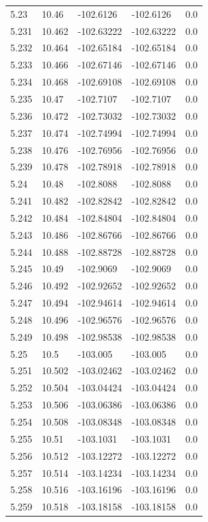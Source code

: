 \begin{tabular}{lllll}
5.23 & 10.46 & -102.6126 & -102.6126 & 0.0 \\
5.231 & 10.462 & -102.63222 & -102.63222 & 0.0 \\
5.232 & 10.464 & -102.65184 & -102.65184 & 0.0 \\
5.233 & 10.466 & -102.67146 & -102.67146 & 0.0 \\
5.234 & 10.468 & -102.69108 & -102.69108 & 0.0 \\
5.235 & 10.47 & -102.7107 & -102.7107 & 0.0 \\
5.236 & 10.472 & -102.73032 & -102.73032 & 0.0 \\
5.237 & 10.474 & -102.74994 & -102.74994 & 0.0 \\
5.238 & 10.476 & -102.76956 & -102.76956 & 0.0 \\
5.239 & 10.478 & -102.78918 & -102.78918 & 0.0 \\
5.24 & 10.48 & -102.8088 & -102.8088 & 0.0 \\
5.241 & 10.482 & -102.82842 & -102.82842 & 0.0 \\
5.242 & 10.484 & -102.84804 & -102.84804 & 0.0 \\
5.243 & 10.486 & -102.86766 & -102.86766 & 0.0 \\
5.244 & 10.488 & -102.88728 & -102.88728 & 0.0 \\
5.245 & 10.49 & -102.9069 & -102.9069 & 0.0 \\
5.246 & 10.492 & -102.92652 & -102.92652 & 0.0 \\
5.247 & 10.494 & -102.94614 & -102.94614 & 0.0 \\
5.248 & 10.496 & -102.96576 & -102.96576 & 0.0 \\
5.249 & 10.498 & -102.98538 & -102.98538 & 0.0 \\
5.25 & 10.5 & -103.005 & -103.005 & 0.0 \\
5.251 & 10.502 & -103.02462 & -103.02462 & 0.0 \\
5.252 & 10.504 & -103.04424 & -103.04424 & 0.0 \\
5.253 & 10.506 & -103.06386 & -103.06386 & 0.0 \\
5.254 & 10.508 & -103.08348 & -103.08348 & 0.0 \\
5.255 & 10.51 & -103.1031 & -103.1031 & 0.0 \\
5.256 & 10.512 & -103.12272 & -103.12272 & 0.0 \\
5.257 & 10.514 & -103.14234 & -103.14234 & 0.0 \\
5.258 & 10.516 & -103.16196 & -103.16196 & 0.0 \\
5.259 & 10.518 & -103.18158 & -103.18158 & 0.0 \\

\end{tabular}
